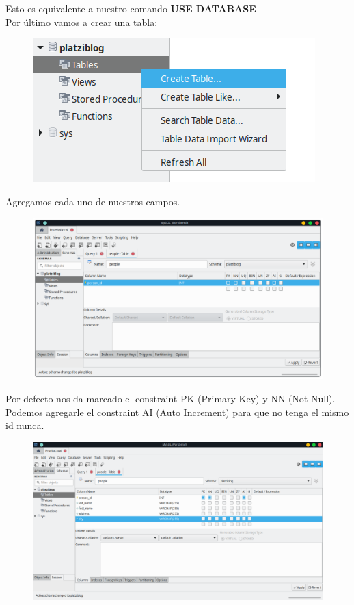 \documentclass{article}
\begin{document}
Esto es equivalente a nuestro comando \textbf{USE DATABASE}\\

Por último vamos a crear una tabla:

\begin{figure}[h!]
  \centering
  \includegraphics[scale=0.65]{./Pictures/044_create_table.png}
\end{figure}

Agregamos cada uno de nuestros campos.\\

\begin{figure}[h!]
  \centering
  \includegraphics[scale=0.55]{./Pictures/045_person_id.png}
\end{figure}

\newpage
Por defecto nos da marcado el constraint PK (Primary Key) y NN (Not Null).
Podemos agregarle el constraint AI (Auto Increment) para que no tenga el mismo
id nunca.\\

\begin{figure}[h!]
  \centering
  \includegraphics[scale=0.45]{./Pictures/046_people_atributos.png}
\end{figure}
\end{document}
